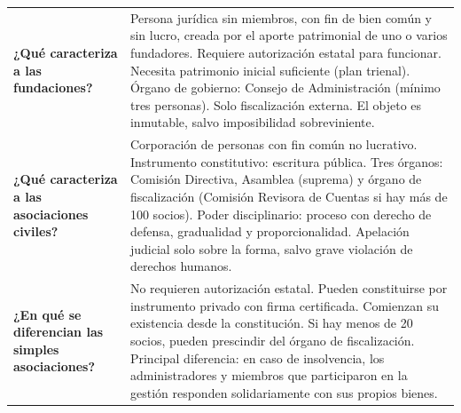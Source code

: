 \documentclass[12pt,oneside]{book}
\begin{document}
\begin{longtable}{
    >{\raggedright\arraybackslash}p{}
    >{\raggedright\arraybackslash}X
}
\textbf{¿Qué caracteriza a las fundaciones?} &
Persona jurídica sin miembros, con fin de bien común y sin lucro, creada por el aporte patrimonial de uno o varios fundadores. Requiere autorización estatal para funcionar. Necesita patrimonio inicial suficiente (plan trienal). Órgano de gobierno: Consejo de Administración (mínimo tres personas). Solo fiscalización externa. El objeto es inmutable, salvo imposibilidad sobreviniente. \\[0.4em]

\textbf{¿Qué caracteriza a las asociaciones civiles?} &
Corporación de personas con fin común no lucrativo. Instrumento constitutivo: escritura pública. Tres órganos: Comisión Directiva, Asamblea (suprema) y órgano de fiscalización (Comisión Revisora de Cuentas si hay más de 100 socios). Poder disciplinario: proceso con derecho de defensa, gradualidad y proporcionalidad. Apelación judicial solo sobre la forma, salvo grave violación de derechos humanos. \\[0.4em]

\textbf{¿En qué se diferencian las simples asociaciones?} &
No requieren autorización estatal. Pueden constituirse por instrumento privado con firma certificada. Comienzan su existencia desde la constitución. Si hay menos de 20 socios, pueden prescindir del órgano de fiscalización. Principal diferencia: en caso de insolvencia, los administradores y miembros que participaron en la gestión responden solidariamente con sus propios bienes. \\[0.4em]


\end{longtable}
\end{document}
